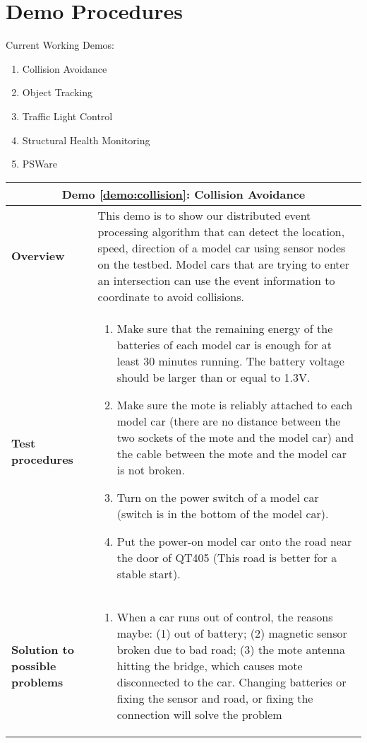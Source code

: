\section{Demo Procedures}
\label{sec:procedure}
Current Working Demos:
\begin{enumerate}
\item Collision Avoidance \label{demo:collision}
\item Object Tracking \label{demo:tracking}
\item Traffic Light Control \label{demo:trafficLight}
\item Structural Health Monitoring \label{demo:shm}
\item PSWare \label{demo:psware}
\end{enumerate}

\begin{center}
	\begin{tabular}{ | p{2cm} | p{10cm} | }
		\hline
		\multicolumn{2}{|c|}{\textbf{Demo \ref{demo:collision}: Collision Avoidance}} \\ \hline
		\textbf{Overview} &  This demo is to show our distributed event processing algorithm that can detect the location, speed, direction of a model car using sensor nodes on the testbed. Model cars that are trying to enter an intersection can use the event information to coordinate to avoid collisions. \\ \hline
		\textbf{Test procedures} &
		\begin{enumerate}
		\item Make sure that the remaining energy of the batteries of each model car is enough for at least 30 minutes running. The battery voltage should be larger than or equal to 1.3V.
		\item Make sure the mote is reliably attached to each model car (there are no distance between the two sockets of the mote and the model car) and the cable between the mote and the model car is not broken.
		\item Turn on the power switch of a model car (switch is in the bottom of the model car).
		\item Put the power-on model car onto the road near the door of QT405 (This road is better for a stable start).
		\end{enumerate} \\ \hline
		\textbf{Solution to possible problems} &
		\begin{enumerate}
		\item When a car runs out of control, the reasons maybe: (1) out of battery; (2) magnetic sensor broken due to bad road; (3) the mote antenna hitting the bridge, which causes mote disconnected to the car. Changing batteries or fixing the sensor and road, or fixing the connection will solve the problem

\end{enumerate}
\end{tabular}
\end{center}
